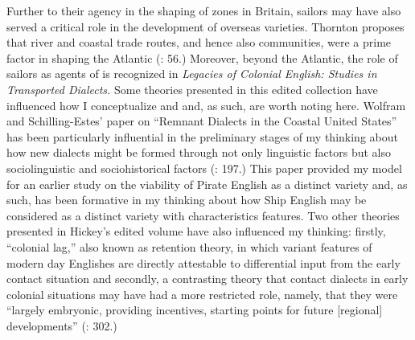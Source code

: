 Further to their agency in the shaping of  zones in Britain, sailors may have also served a critical role in the development of overseas varieties. Thornton proposes that river and coastal trade routes, and hence also  communities, were a prime factor in shaping the  Atlantic (: 56.) Moreover, beyond the Atlantic, the role of sailors as agents of  is recognized in  \textit{Legacies of Colonial English: Studies in Transported Dialects.} Some theories presented in this edited collection have influenced how I conceptualize  and  and, as such, are worth noting here. Wolfram and Schilling-Estes’ paper on “Remnant Dialects in the Coastal United States” has been particularly influential in the preliminary stages of my thinking about how new dialects might be formed through not only linguistic factors but also sociolinguistic and sociohistorical factors (\citeyear{WolframSchillingEstes2004}: 197.) This paper provided my model for an earlier study on the viability of  Pirate English as a distinct variety \citep{Delgado2013} and, as such, has been formative in my thinking about how Ship English may be considered as a distinct variety with characteristics features. Two other theories presented in Hickey’s edited volume have also influenced my thinking: firstly, “colonial lag,” also known as retention theory, in which variant features of modern day Englishes are directly attestable to differential input from the early contact situation \citep[8,]{Hickey2004} and secondly, a contrasting theory that contact dialects in early colonial situations may have had a more restricted role, namely, that they were “largely embryonic, providing incentives, starting points for future [regional] developments” (\citealt{Schneider2004}: 302.) 

